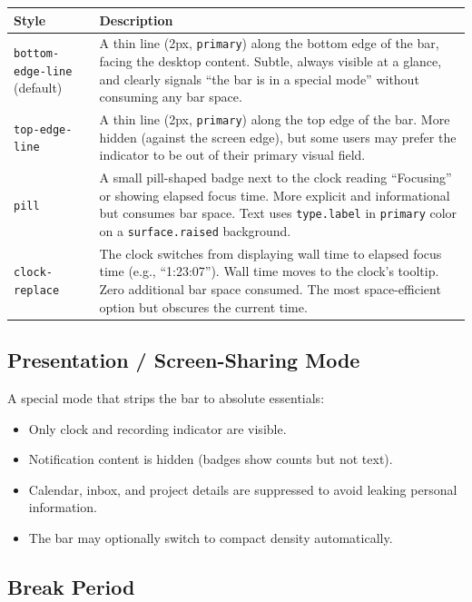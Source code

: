 \documentclass[11pt,a4paper]{article}
\begin{document}
\begin{longtable}{p{3.5cm} p{10cm}}
\toprule
\textbf{Style} & \textbf{Description} \\
\midrule
\texttt{bottom-edge-line} (default) & A thin line (2px, \texttt{primary}) along the bottom edge of the bar, facing the desktop content. Subtle, always visible at a glance, and clearly signals ``the bar is in a special mode'' without consuming any bar space. \\
\addlinespace
\texttt{top-edge-line} & A thin line (2px, \texttt{primary}) along the top edge of the bar. More hidden (against the screen edge), but some users may prefer the indicator to be out of their primary visual field. \\
\addlinespace
\texttt{pill} & A small pill-shaped badge next to the clock reading ``Focusing'' or showing elapsed focus time. More explicit and informational but consumes bar space. Text uses \texttt{type.label} in \texttt{primary} color on a \texttt{surface.raised} background. \\
\addlinespace
\texttt{clock-replace} & The clock switches from displaying wall time to elapsed focus time (e.g., ``1:23:07''). Wall time moves to the clock's tooltip. Zero additional bar space consumed. The most space-efficient option but obscures the current time. \\
\bottomrule
\end{longtable}

\subsection{Presentation / Screen-Sharing Mode}

A special mode that strips the bar to absolute essentials:

\begin{itemize}[leftmargin=1.5em, itemsep=3pt]
  \item Only clock and recording indicator are visible.
  \item Notification content is hidden (badges show counts but not text).
  \item Calendar, inbox, and project details are suppressed to avoid leaking personal information.
  \item The bar may optionally switch to compact density automatically.
\end{itemize}

\subsection{Break Period}
\end{document}

